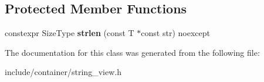\subsection*{Protected Member Functions}
\begin{DoxyCompactItemize}
\item 
\mbox{\label{classbzd_1_1impl_1_1StringView_ab5424556474dbf472948e5e9a68ec529}} 
constexpr Size\+Type {\bfseries strlen} (const T $\ast$const str) noexcept
\end{DoxyCompactItemize}


The documentation for this class was generated from the following file\+:\begin{DoxyCompactItemize}
\item 
include/container/string\+\_\+view.\+h\end{DoxyCompactItemize}
